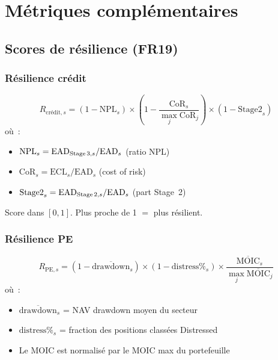 \documentclass[12pt,a4paper]{article}
\begin{document}
\section{M\'etriques compl\'ementaires}
\label{sec:complementary}

\subsection{Scores de r\'esilience (FR19)}

\subsubsection{R\'esilience cr\'edit}

\begin{formulebox}
\begin{equation}
    R_{\text{cr\'edit},s} = (1 - \text{NPL}_{s}) \times \left(1 - \frac{\text{CoR}_s}{\max_j \text{CoR}_j}\right) \times (1 - \text{Stage2}_{s})
    \label{eq:resilience_credit}
\end{equation}
o\`u~:
\begin{itemize}[nosep]
    \item $\text{NPL}_s = \text{EAD}_{\text{Stage\,3},s} / \text{EAD}_s$ (ratio NPL)
    \item $\text{CoR}_s = \text{ECL}_s / \text{EAD}_s$ (cost of risk)
    \item $\text{Stage2}_s = \text{EAD}_{\text{Stage\,2},s} / \text{EAD}_s$ (part Stage~2)
\end{itemize}
Score dans $[0, 1]$. Plus proche de 1 $=$ plus r\'esilient.
\end{formulebox}

\subsubsection{R\'esilience PE}

\begin{formulebox}
\begin{equation}
    R_{\text{PE},s} = (1 - \overline{\text{drawdown}}_s) \times (1 - \text{distress\%}_s) \times \frac{\overline{\text{MOIC}}_s}{\max_j \overline{\text{MOIC}}_j}
    \label{eq:resilience_pe}
\end{equation}
o\`u~:
\begin{itemize}[nosep]
    \item $\overline{\text{drawdown}}_s$ = NAV drawdown moyen du secteur
    \item $\text{distress\%}_s$ = fraction des positions class\'ees \og Distressed \fg
    \item Le MOIC est normalis\'e par le MOIC max du portefeuille
\end{itemize}
\end{formulebox}
\end{document}
